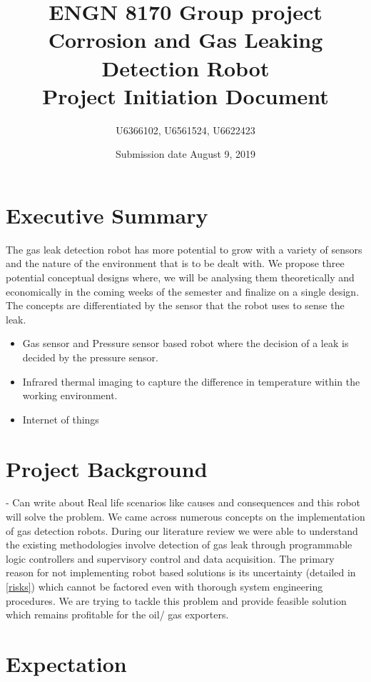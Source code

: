 \documentclass[a4paper]{article}
\title{ENGN 8170 Group project\\ Corrosion and Gas Leaking Detection Robot\\ Project Initiation Document}
\author{U6366102, U6561524, U6622423}
\date{Submission date August 9, 2019}
\begin{document}
\maketitle
\newpage
\tableofcontents
\newpage
{}
\section{Executive Summary}
The gas leak detection robot has more potential to grow with a variety of sensors and the nature of the environment that is to be dealt with. We propose three potential conceptual designs where, we will be analysing them theoretically and economically in the coming weeks of the semester and finalize on a single design. The concepts are differentiated by the sensor that the robot uses to sense the leak.
\begin{itemize}
    \item {Gas sensor and Pressure sensor based robot where the decision of a leak is decided by the pressure sensor.}
    \item{Infrared thermal imaging to capture the difference in temperature within the working environment.}
    \item{Internet of things} %
\end{itemize}
\section {Project Background}
 - Can write about Real life scenarios like causes and consequences and this robot will solve the problem.
 We came across numerous concepts on the implementation of gas detection robots. During our literature review we were able to understand the existing methodologies involve detection of gas leak through programmable logic controllers  and supervisory control and data acquisition. The primary reason for not implementing robot based solutions is its uncertainty (detailed in \ref{risks}) which cannot be factored even with thorough system engineering procedures. We are trying to tackle this problem and provide feasible solution which remains profitable for the oil/ gas exporters.  
\section{Expectation}
\end{document}
